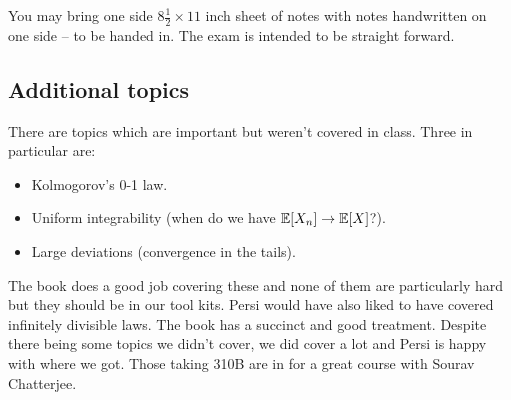 You may bring one side $8 \frac{1}{2}\times 11$ inch sheet of notes with notes handwritten on one side -- to be handed in. The exam is intended to be straight forward.
\subsection{Additional topics}
There are topics which are important but weren't covered in class. \grumpy
Three in particular are:
\begin{itemize}
    \item Kolmogorov's 0-1 law.
    \item Uniform integrability (when do we have ${\mathbb{E}}[X_n]\to {\mathbb{E}}[X]$?).
    \item Large deviations (convergence in the tails).
\end{itemize}
The book does a good job covering these and none of them are particularly hard but they should be in our tool kits. Persi would have also liked to have covered infinitely divisible laws. The book has a succinct and good treatment. Despite there being some topics we didn't cover, we did cover a lot and Persi is happy with where we got. Those taking 310B are in for a great course with Sourav Chatterjee. 
